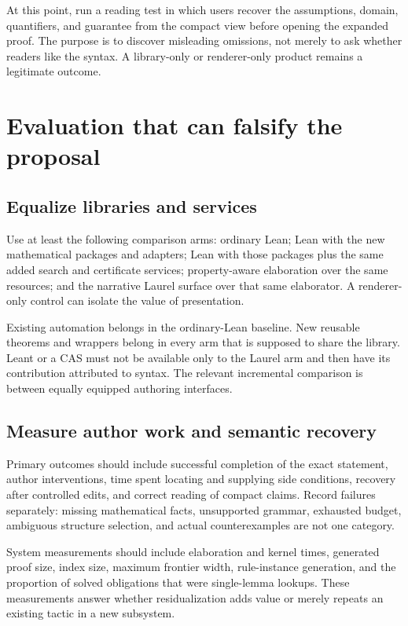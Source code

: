 \documentclass[11pt,a4paper]{article}
\theoremstyle{definition}
\theoremstyle{remark}
\begin{document}
At this point, run a reading test in which users recover the assumptions, domain, quantifiers, and guarantee from the compact view before opening the expanded proof. The purpose is to discover misleading omissions, not merely to ask whether readers like the syntax. A library-only or renderer-only product remains a legitimate outcome.

\section{Evaluation that can falsify the proposal}\label{sec:evaluation}
\subsection{Equalize libraries and services}
Use at least the following comparison arms: ordinary Lean; Lean with the new mathematical packages and adapters; Lean with those packages plus the same added search and certificate services; property-aware elaboration over the same resources; and the narrative Laurel surface over that same elaborator. A renderer-only control can isolate the value of presentation.

Existing automation belongs in the ordinary-Lean baseline. New reusable theorems and wrappers belong in every arm that is supposed to share the library. Leant or a CAS must not be available only to the Laurel arm and then have its contribution attributed to syntax. The relevant incremental comparison is between equally equipped authoring interfaces.

\subsection{Measure author work and semantic recovery}
Primary outcomes should include successful completion of the exact statement, author interventions, time spent locating and supplying side conditions, recovery after controlled edits, and correct reading of compact claims. Record failures separately: missing mathematical facts, unsupported grammar, exhausted budget, ambiguous structure selection, and actual counterexamples are not one category.

System measurements should include elaboration and kernel times, generated proof size, index size, maximum frontier width, rule-instance generation, and the proportion of solved obligations that were single-lemma lookups. These measurements answer whether residualization adds value or merely repeats an existing tactic in a new subsystem.
\end{document}
